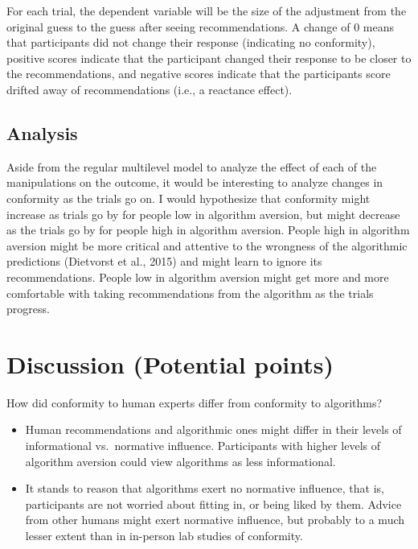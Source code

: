 \documentclass[
  man ,floatsintext]{apa7}
\begin{document}
For each trial, the dependent variable will be the size of the adjustment from the original guess to the guess after seeing recommendations. A change of 0 means that participants did not change their response (indicating no conformity), positive scores indicate that the participant changed their response to be closer to the recommendations, and negative scores indicate that the participants score drifted away of recommendations (i.e., a reactance effect).

\hypertarget{analysis}{%
\subsection{Analysis}\label{analysis}}

Aside from the regular multilevel model to analyze the effect of each of the manipulations on the outcome, it would be interesting to analyze changes in conformity as the trials go on. I would hypothesize that conformity might increase as trials go by for people low in algorithm aversion, but might decrease as the trials go by for people high in algorithm aversion. People high in algorithm aversion might be more critical and attentive to the wrongness of the algorithmic predictions (Dietvorst et al., 2015) and might learn to ignore its recommendations. People low in algorithm aversion might get more and more comfortable with taking recommendations from the algorithm as the trials progress.

\hypertarget{discussion-potential-points}{%
\section{Discussion (Potential points)}\label{discussion-potential-points}}

How did conformity to human experts differ from conformity to algorithms?

\begin{itemize}
\item
  Human recommendations and algorithmic ones might differ in their levels of informational vs.~normative influence. Participants with higher levels of algorithm aversion could view algorithms as less informational.
\item
  It stands to reason that algorithms exert no normative influence, that is, participants are not worried about fitting in, or being liked by them. Advice from other humans might exert normative influence, but probably to a much lesser extent than in in-person lab studies of conformity.
\end{itemize}
\end{document}
